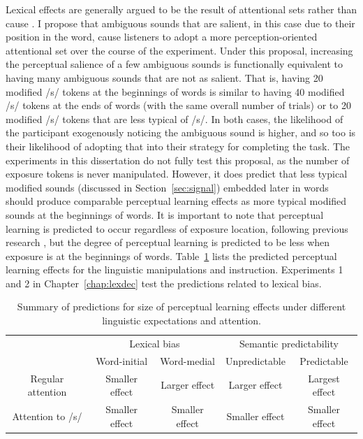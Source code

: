 Lexical effects are generally argued to be the result of attentional sets rather than cause \citep{Cutler1987, Pitt2012}.
I propose that ambiguous sounds that are salient, in this case due to their position in the word, cause listeners to adopt a more perception-oriented attentional set over the course of the experiment.
Under this proposal, increasing the perceptual salience of a few ambiguous sounds is functionally equivalent to having many ambiguous sounds that are not as salient.
That is, having 20 modified /s/ tokens at the beginnings of words is similar to having 40 modified /s/ tokens at the ends of words (with the same overall number of trials) or to 20 modified /s/ tokens that are less typical of /s/.
In both cases, the likelihood of the participant exogenously noticing the ambiguous sound is higher, and so too is their likelihood of adopting that into their strategy for completing the task.
The experiments in this dissertation do not fully test this proposal, as the number of exposure tokens is never manipulated.
However, it does predict that less typical modified sounds (discussed in Section~\ref{sec:signal}) embedded later in words should produce comparable perceptual learning effects as more typical modified sounds at the beginnings of words.
It is important to note that perceptual learning is predicted to occur regardless of exposure location, following previous research \citep{Norris2003,Kraljic2005, Kraljic2008, Kraljic2008,Clare2014}, but the degree of perceptual learning is predicted to be less when exposure is at the beginnings of words.
Table~\ref{tbl:predictions} lists the predicted perceptual learning effects for the linguistic manipulations and instruction.
Experiments 1 and 2  in Chapter~\ref{chap:lexdec} test the predictions related to lexical bias.

\begin{table}[ht]
\caption{Summary of predictions for size of perceptual learning effects under different linguistic expectations and attention.}
\label{tbl:predictions}
\centering
\small
\begin{tabular}{cccccc}
\toprule
                  &                   & \multicolumn{2}{c}{Lexical bias} & \multicolumn{2}{c}{Semantic predictability} \\
\cmidrule(r){3-4}
\cmidrule(r){5-6}
                  &                   & Word-initial    & Word-medial    & Unpredictable        & Predictable          \\
\midrule
\multicolumn{2}{c}{Regular attention} & Smaller effect  & Larger effect  & Larger effect       & Largest effect        \\
\multicolumn{2}{c}{Attention to /s/}  & Smaller effect  & Smaller effect & Smaller effect       & Smaller effect  \\
\bottomrule    
\end{tabular}
\end{table}

